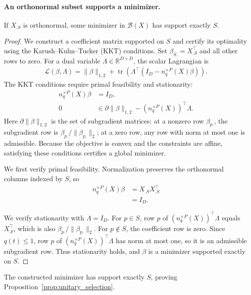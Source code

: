 \paragraph{An orthonormal subset supports a minimizer.}
\begin{proposition}
\label{prop:kkt}
If $X_{.S}$ is orthonormal, some minimizer in $\mathcal B(X)$ has support exactly $S$.
\end{proposition}
\begin{proof}
We construct a coefficient matrix supported on $S$ and certify its optimality using the Karush--Kuhn--Tucker (KKT) conditions.
Set $\beta_{S.}=X_{.S}^\top$ and all other rows to zero.
For a dual variable $\Lambda\in\mathbb R^{D\times D}$, the scalar Lagrangian is
\begin{align}
\mathcal L(\beta,\Lambda)
=\|\beta\|_{1,2}+\operatorname{tr}\!\left(\Lambda^\top(I_D-n_q^{\times P}(X)\beta)\right).
\end{align}
The KKT conditions require primal feasibility and stationarity:
\begin{align}
n_q^{\times P}(X)\beta&=I_D, \\
0&\in\partial\|\beta\|_{1,2}-(n_q^{\times P}(X))^\top\Lambda.
\end{align}
Here $\partial\|\beta\|_{1,2}$ is the set of subgradient matrices: at a nonzero row $\beta_{p.}$, the subgradient row is $\beta_{p.}/\|\beta_{p.}\|_2$; at a zero row, any row with norm at most one is admissible.
Because the objective is convex and the constraints are affine, satisfying these conditions certifies a global minimizer.

We first verify primal feasibility.
Normalization preserves the orthonormal columns indexed by $S$, so
\begin{align}
n_q^{\times P}(X)\beta
&=X_{.S}X_{.S}^\top \\
&=I_D.
\end{align}

We verify stationarity with $\Lambda=I_D$.
For $p\in S$, row $p$ of $(n_q^{\times P}(X))^\top\Lambda$ equals $X_{.p}^\top$, which is also $\beta_{p.}/\|\beta_{p.}\|_2$.
For $p\notin S$, the coefficient row is zero.
Since $q(t)\leq1$, row $p$ of $(n_q^{\times P}(X))^\top\Lambda$ has norm at most one, so it is an admissible subgradient row.
Thus stationarity holds, and $\beta$ is a minimizer supported exactly on $S$.
\end{proof}

The constructed minimizer has support exactly $S$, proving Proposition~\ref{prop:unitary_selection}.

